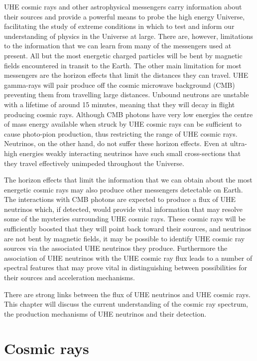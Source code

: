 UHE cosmic rays and other astrophysical messengers carry information about their sources and provide a powerful means to probe the high energy Universe, facilitating the study of extreme conditions in which to test and inform our understanding of physics in the Universe at large. There are, however, limitations to the information that we can learn from many of the messengers used at present. All but the most energetic charged particles will be bent by magnetic fields encountered in transit to the Earth. The other main limitation for most messengers are the horizon effects that limit the distances they can travel. UHE gamma-rays will pair produce \Pelectron\Ppositron off the cosmic microwave background (CMB) preventing them from travelling large distances. Unbound neutrons are unstable with a lifetime of around 15 minutes, meaning that they will decay in flight producing cosmic rays. Although CMB photons have very low energies the centre of mass energy available when struck by UHE cosmic rays can be sufficient to cause photo-pion production, thus restricting the range of UHE cosmic rays. Neutrinos, on the other hand, do not suffer these horizon effects. Even at ultra-high energies weakly interacting neutrinos have such small cross-sections that they travel effectively unimpeded throughout the Universe. 

The horizon effects that limit the information that we can obtain about the most energetic cosmic rays may also produce other messengers detectable on Earth. The interactions with CMB photons are expected to produce a flux of UHE neutrinos which, if detected, would provide vital information that may resolve some of the mysteries surrounding UHE cosmic rays. These cosmic rays will be sufficiently boosted that they will point back toward their sources, and neutrinos are not bent by magnetic fields, it may be possible to identify UHE cosmic ray sources via the associated UHE neutrinos they produce. Furthermore the association of UHE neutrinos with the UHE cosmic ray flux leads to a number of spectral features that may prove vital in distinguishing between possibilities for their sources and acceleration mechanisms.

There are strong links between the flux of UHE neutrinos and UHE cosmic rays. This chapter will discuss the current understanding of the cosmic ray spectrum, the production mechanisms of UHE neutrinos and their detection.

\section{Cosmic rays}
\label{section:uhe-app:Cosmic-Rays}


